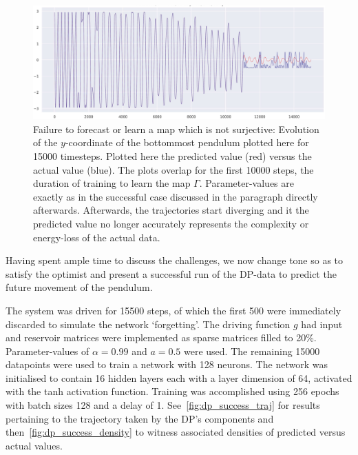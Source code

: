 \begin{figure}[ht]
  \includegraphics[scale=0.3]{Graphs/_dpfail_nonsurj.eps}
  \centering
\caption{Failure to forecast or learn a map which is not surjective: Evolution of the $y$-coordinate of the bottommost pendulum plotted here for 15000 timesteps. Plotted here the predicted value (red) versus the actual value (blue). The plots overlap for the first 10000 steps, the duration of training to learn the map $\Gamma$. Parameter-values are exactly as in the successful case discussed in the paragraph directly afterwards. Afterwards, the trajectories start diverging and it the predicted value no longer accurately represents the complexity or energy-loss of the actual data. }
\label{fig:dp_notsurjective}
\end{figure}


Having spent ample time to discuss the challenges, we now change tone so as to satisfy the optimist and present a successful run of the DP-data to predict the future movement of the pendulum.

The system was driven for 15500 steps, of which the first 500 were immediately discarded to simulate the network `forgetting'. The driving function $g$ had input and reservoir matrices were implemented as sparse matrices filled to 20\%. Parameter-values of $\alpha=0.99$ and $a=0.5$ were used.
The remaining 15000 datapoints were used to train a network with 128 neurons. 
The network was initialised to contain 16 hidden layers each with a layer dimension of 64, activated with the tanh activation function.
Training was accomplished using 256 epochs with batch sizes 128 and a delay of 1. See~\ref{fig:dp_success_traj} for results pertaining to the trajectory taken by the DP's components and then~\ref{fig:dp_success_density} to witness associated densities of predicted versus actual values.


